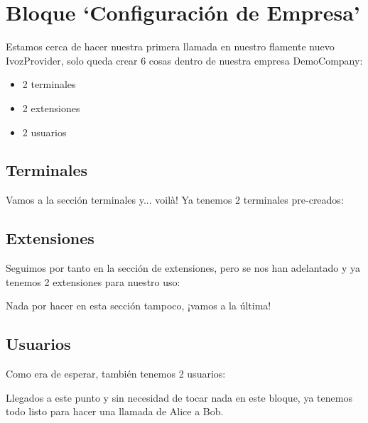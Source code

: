 \documentclass[letterpaper,10pt,spanish]{sphinxmanual}
\begin{document}


\section{Bloque `Configuración de Empresa'}
\label{internal_calls/company_portal:bloque-configuracion-de-empresa}\label{internal_calls/company_portal::doc}
Estamos cerca de hacer nuestra primera llamada en nuestro flamente nuevo IvozProvider, solo queda crear 6 cosas dentro de nuestra empresa DemoCompany:
\begin{itemize}
\item {} 
2 terminales

\item {} 
2 extensiones

\item {} 
2 usuarios

\end{itemize}


\subsection{Terminales}
\label{internal_calls/company_portal:terminales}
Vamos a la sección terminales y... voilà! Ya tenemos 2 terminales pre-creados:

\noindent{}


\subsection{Extensiones}
\label{internal_calls/company_portal:extensiones}
Seguimos por tanto en la sección de extensiones, pero se nos han adelantado y ya tenemos 2 extensiones para nuestro uso:

\noindent{}

Nada por hacer en esta sección tampoco, ¡vamos a la última!


\subsection{Usuarios}
\label{internal_calls/company_portal:usuarios}
Como era de esperar, también tenemos 2 usuarios:

\noindent{}

Llegados a este punto y sin necesidad de tocar nada en este bloque, ya tenemos todo listo para hacer una llamada de Alice a Bob.
\end{document}
